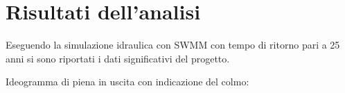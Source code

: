 \section{Risultati dell'analisi}
Eseguendo la simulazione idraulica {} con SWMM con tempo di ritorno pari a 25 anni si sono riportati i dati significativi del progetto.

Ideogramma di piena in uscita con indicazione del colmo: 

